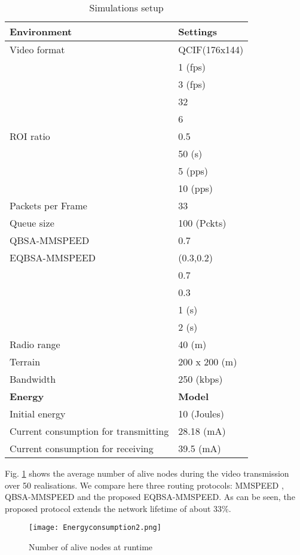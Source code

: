 \documentclass[conference,a4paper]{IEEEtran}
\begin{document}
\begin{table}[htb]
\centering
\caption{Simulations setup}
\label{config}
\begin{footnotesize}
\begin{tabular}{l l}
\hline
\hspace{1.5cm} \textbf{Environment} & \hspace{-1.25cm} \textbf{Settings} \\
\hline
Video format & QCIF(176x144)\\
\hline
 & 1 (fps)\\
\hline
 & 3 (fps)\\
\hline
 & 32\\
\hline
 & 6\\
\hline
ROI ratio & 0.5\\
\hline
 & 50 (s)\\
\hline
  & 5 (pps)\\
\hline
  & 10 (pps)\\
\hline
Packets per Frame & 33\\
\hline
Queue size & 100 (Pckts)\\
\hline
QBSA-MMSPEED & 0.7\\
\hline
EQBSA-MMSPEED & (0.3,0.2)\\
\hline
 & 0.7\\
\hline
 & 0.3\\
\hline
 & 1 (s)\\
\hline
 & 2 (s)\\
\hline
Radio range & 40 (m)\\
\hline
Terrain & 200 x 200 (m) \\
\hline
Bandwidth & 250 (kbps)\\
\hline
\hspace{2cm} \textbf{Energy} & \hspace{-1.75cm} \textbf{Model} \\
\hline
Initial energy & 10 (Joules)\\
\hline
Current consumption for transmitting & 28.18 (mA)\\
\hline
Current consumption for receiving & 39.5 (mA)\\
\hline
\end{tabular}
\end{footnotesize}
\end{table}

Fig. \ref{EC} shows the average number of alive nodes during the video transmission over 50 realisations. We compare here three routing protocols: MMSPEED \cite{mmspeed}, QBSA-MMSPEED \cite{our} and the proposed EQBSA-MMSPEED. As can be seen, the proposed protocol extends the network lifetime of  about 33\%.
\begin{figure}[htb]
\hspace{-0.80cm}\texttt{[image: Energyconsumption2.png]}
\caption{Number of alive nodes at runtime}
\label{EC}
\end{figure}
\end{document}
